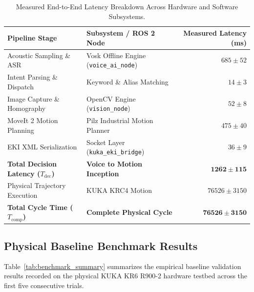 \documentclass[runningheads]{llncs}
\begin{document}
\begin{table}[tb]
\caption{Measured End-to-End Latency Breakdown Across Hardware and Software Subsystems.}
\label{tab:latency_breakdown}
\centering
\begin{tabular}{llr}
\toprule
\textbf{Pipeline Stage} & \textbf{Subsystem / ROS 2 Node} & \textbf{Measured Latency (ms)} \\
\midrule
Acoustic Sampling \& ASR & Vosk Offline Engine (\texttt{voice\_ai\_node}) & $685 \pm 52$ \\
Intent Parsing \& Dispatch & Keyword \& Alias Matching & $14 \pm 3$ \\
Image Capture \& Homography & OpenCV Engine (\texttt{vision\_node}) & $52 \pm 8$ \\
MoveIt 2 Motion Planning & Pilz Industrial Motion Planner & $475 \pm 40$ \\
EKI XML Serialization & Socket Layer (\texttt{kuka\_eki\_bridge}) & $36 \pm 9$ \\
\midrule
\textbf{Total Decision Latency ($T_{\text{dec}}$)} & \textbf{Voice to Motion Inception} & $\mathbf{1262 \pm 115}$ \\
Physical Trajectory Execution & KUKA KRC4 Motion & $76526 \pm 3150$ \\
\midrule
\textbf{Total Cycle Time ($T_{\text{comp}}$)} & \textbf{Complete Physical Cycle} & $\mathbf{76526 \pm 3150}$ \\
\bottomrule
\end{tabular}
\end{table}

\subsection{Physical Baseline Benchmark Results}
Table~\ref{tab:benchmark_summary} summarizes the empirical baseline validation results recorded on the physical KUKA KR6 R900-2 hardware testbed across the first five consecutive trials.
\end{document}
